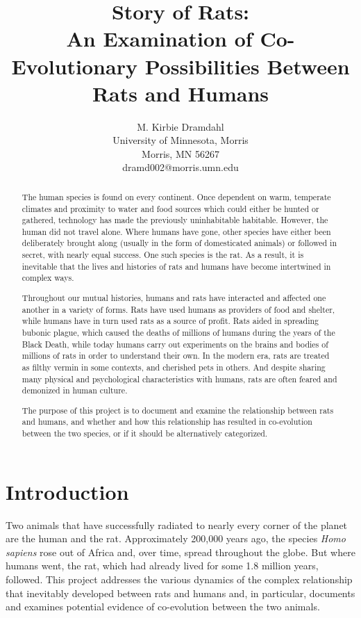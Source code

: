 \documentclass[12pt]{article}
\title{Story of Rats:\\
       An Examination of Co-Evolutionary Possibilities Between Rats and Humans}
\author{
 		M. Kirbie Dramdahl\\
        University of Minnesota, Morris\\
        Morris, MN 56267\\
        dramd002@morris.umn.edu\\
}
\date{}
\begin{document}
\pagestyle{plain}

\maketitle

\begin{abstract}

The human species is found on every continent. Once dependent on warm, temperate climates and proximity to water and food sources which could either be hunted or gathered, technology has made the previously uninhabitable habitable. However, the human did not travel alone. Where humans have gone, other species have either been deliberately brought along (usually in the form of domesticated animals) or followed in secret, with nearly equal success. One such species is the rat. As a result, it is inevitable that the lives and histories of rats and humans have become intertwined in complex ways.

Throughout our mutual histories, humans and rats have interacted and affected one another in a variety of forms. Rats have used humans as providers of food and shelter, while humans have in turn used rats as a source of profit. Rats aided in spreading bubonic plague, which caused the deaths of millions of humans during the years of the Black Death, while today humans carry out experiments on the brains and bodies of millions of rats in order to understand their own. In the modern era, rats are treated as filthy vermin in some contexts, and cherished pets in others. And despite sharing many physical and psychological characteristics with humans, rats are often feared and demonized in human culture.

The purpose of this project is to document and examine the relationship between rats and humans, and whether and how this relationship has resulted in co-evolution between the two species, or if it should be alternatively categorized.

\pagebreak

\end{abstract}

\section{Introduction} \label{Introduction}

Two animals that have successfully radiated to nearly every corner of the planet are the human and the rat. Approximately 200,000 years ago, the species \textit{Homo sapiens} rose out of Africa and, over time, spread throughout the globe. But where humans went, the rat, which had already lived for some 1.8 million years, followed. This project addresses the various dynamics of the complex relationship that inevitably developed between rats and humans and, in particular, documents and examines potential evidence of co-evolution between the two animals.
\end{document}
